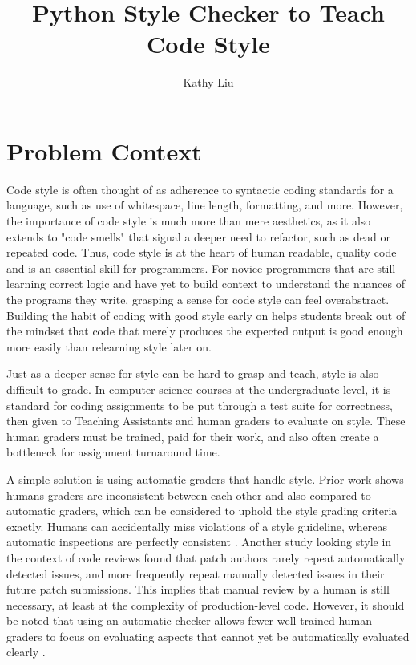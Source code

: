 \documentclass[10pt,twocolumn]{article}
\title{Python Style Checker to Teach Code Style}
\author{Kathy Liu}
\affiliation{Occidental College}
\begin{document}
\maketitle

\section{Problem Context}
Code style is often thought of as adherence to syntactic coding standards for a language, such as use of whitespace, line length, formatting, and more. 
However, the importance of code style is much more than mere aesthetics, as it also extends to "code smells" that signal a deeper need to refactor, such as dead or repeated code. 
Thus, code style is at the heart of human readable, quality code and is an essential skill for programmers. 
For novice programmers that are still learning correct logic and have yet to build context to understand the nuances of the programs they write, grasping a sense for code style can feel overabstract. 
Building the habit of coding with good style early on helps students break out of the mindset that code that merely produces the expected output is good enough more easily than relearning style later on.

Just as a deeper sense for style can be hard to grasp and teach, style is also difficult to grade. 
In computer science courses at the undergraduate level, it is standard for coding assignments to be put through a test suite for correctness, then given to Teaching Assistants and human graders to evaluate on style. 
These human graders must be trained, paid for their work, and also often create a bottleneck for assignment turnaround time. 

A simple solution is using automatic graders that handle style. 
Prior work shows humans graders are inconsistent between each other and also compared to automatic graders, which can be considered to uphold the style grading criteria exactly. 
Humans can accidentally miss violations of a style guideline, whereas automatic inspections are perfectly consistent \cite{perretta_2019}. 
Another study looking style in the context of code reviews found that patch authors rarely repeat automatically detected issues, and more frequently repeat manually detected issues in their future patch submissions. 
This implies that manual review by a human is still necessary, at least at the complexity of production-level code. 
However, it should be noted that using an automatic checker allows fewer well-trained human graders to focus on evaluating aspects that cannot yet be automatically evaluated clearly \cite{ueda_2018}.
\end{document}
